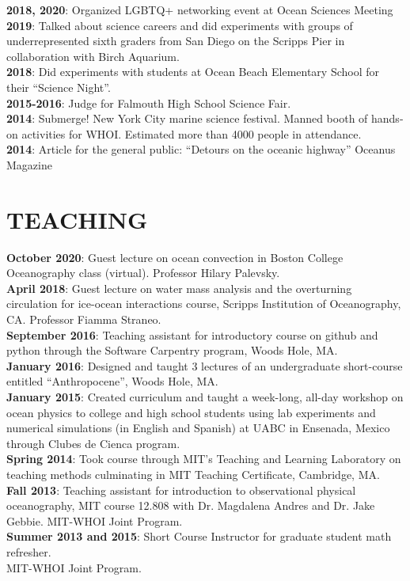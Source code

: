 \documentclass[paper=letter,fontsize=11pt]{scrartcl} %
\newcommand{\NewPart}[2]{\section*{\uppercase{#1} #2}}
\newcommand{\ShortEntry}[2]{\normalsize \noindent \textbf{#1}: #2 \\ }
\begin{document}
\ShortEntry{2018, 2020}{Organized LGBTQ+ networking event at Ocean Sciences Meeting}

\ShortEntry{2019}{Talked about science careers and did experiments with groups of underrepresented sixth graders from San Diego on the Scripps Pier in collaboration with Birch Aquarium.}

\ShortEntry{2018}{Did experiments with students at Ocean Beach Elementary School for their ``Science Night''.}

\ShortEntry{2015-2016}{Judge for Falmouth High School Science Fair.}

\ShortEntry{2014}{Submerge! New York City marine science festival. Manned booth of hands-on activities for WHOI. Estimated more than 4000 people in attendance.}

\ShortEntry{2014}{Article for the general public: ``Detours on the oceanic highway'' Oceanus Magazine}

\NewPart{Teaching}{}

\ShortEntry{October 2020}{Guest lecture on ocean convection in Boston College Oceanography class (virtual). Professor Hilary Palevsky.}

\ShortEntry{April 2018}{Guest lecture on water mass analysis and the overturning circulation for ice-ocean interactions course, Scripps Institution of Oceanography, CA. Professor Fiamma Straneo.}

\ShortEntry{September 2016}{Teaching assistant for introductory course on github and python through the Software Carpentry program, Woods Hole, MA.}

\ShortEntry{January 2016}{Designed and taught 3 lectures of an undergraduate short-course entitled ``Anthropocene'', Woods Hole, MA.}

\ShortEntry{January 2015}{Created curriculum and taught a week-long, all-day workshop on ocean physics to college and high school students using lab experiments and numerical simulations (in English and Spanish) at UABC in Ensenada, Mexico through Clubes de Cienca program.}

\ShortEntry{Spring 2014}{Took course through MIT's Teaching and Learning Laboratory on teaching methods culminating in MIT Teaching Certificate, Cambridge, MA.}

\ShortEntry{Fall 2013}{Teaching assistant for introduction to observational physical oceanography, MIT course 12.808 with Dr. Magdalena Andres and Dr. Jake Gebbie. MIT-WHOI Joint Program.}

\ShortEntry{Summer 2013 and 2015}{Short Course Instructor for graduate student math refresher.\\ MIT-WHOI Joint Program.}
\end{document}
